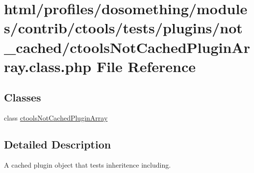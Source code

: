 \hypertarget{ctoolsNotCachedPluginArray_8class_8php}{
\section{html/profiles/dosomething/modules/contrib/ctools/tests/plugins/not\_\-cached/ctoolsNotCachedPluginArray.class.php File Reference}
\label{ctoolsNotCachedPluginArray_8class_8php}
}
\subsection*{Classes}
\begin{DoxyCompactItemize}
\item 
class \hyperlink{classctoolsNotCachedPluginArray}{ctoolsNotCachedPluginArray}
\end{DoxyCompactItemize}


\subsection{Detailed Description}
A cached plugin object that tests inheritence including. 